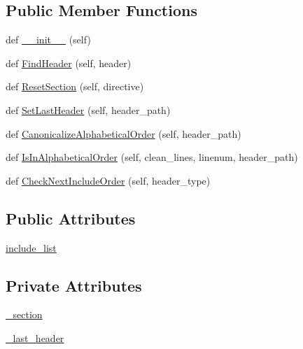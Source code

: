 \subsection*{Public Member Functions}
\begin{DoxyCompactItemize}
\item 
def \hyperlink{classcpplint_1_1__IncludeState_a4d3ae4ee2a38efc25cce07e3e8484ba4}{\+\_\+\+\_\+init\+\_\+\+\_\+} (self)
\item 
def \hyperlink{classcpplint_1_1__IncludeState_a9bddbf581fc7a4c3c0258eaa42b94c3a}{Find\+Header} (self, header)
\item 
def \hyperlink{classcpplint_1_1__IncludeState_a31551f83fcc626e7babb1581a486b6fa}{Reset\+Section} (self, directive)
\item 
def \hyperlink{classcpplint_1_1__IncludeState_a9bc1ada2060a49628c1fffa973b57df1}{Set\+Last\+Header} (self, header\+\_\+path)
\item 
def \hyperlink{classcpplint_1_1__IncludeState_ae69c652befa2d160194c0a02ff0c7d48}{Canonicalize\+Alphabetical\+Order} (self, header\+\_\+path)
\item 
def \hyperlink{classcpplint_1_1__IncludeState_abfda27324121ab0bf9d29866d975274b}{Is\+In\+Alphabetical\+Order} (self, clean\+\_\+lines, linenum, header\+\_\+path)
\item 
def \hyperlink{classcpplint_1_1__IncludeState_a80f82f17565e8412e7e5bbe52b464f18}{Check\+Next\+Include\+Order} (self, header\+\_\+type)
\end{DoxyCompactItemize}
\subsection*{Public Attributes}
\begin{DoxyCompactItemize}
\item 
\hyperlink{classcpplint_1_1__IncludeState_a82d8b92a431437ee181e950517c71cbb}{include\+\_\+list}
\end{DoxyCompactItemize}
\subsection*{Private Attributes}
\begin{DoxyCompactItemize}
\item 
\hyperlink{classcpplint_1_1__IncludeState_ab1a8864f105dd145d84fe88ba04c3565}{\+\_\+section}
\item 
\hyperlink{classcpplint_1_1__IncludeState_adcb4bc7a995593913ab71672ca314649}{\+\_\+last\+\_\+header}
\end{DoxyCompactItemize}
